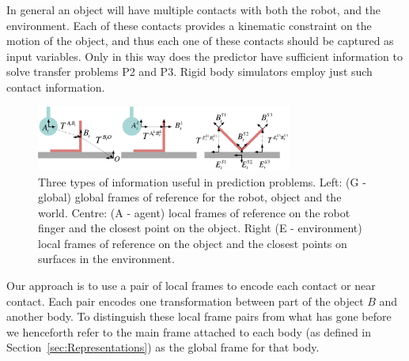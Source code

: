 In general an object will have multiple contacts with both the robot, and the environment. Each of these contacts provides a kinematic constraint on the motion of the object, and thus each one of these contacts should be captured as input variables. Only in this way does the predictor have sufficient information to solve transfer problems P2 and P3. Rigid body simulators employ just such contact information. 


\begin{figure}[t]
\centerline{\includegraphics[width=0.75\textwidth]{information}}
\caption{Three types of information useful in prediction problems. Left: (G - global) global frames of reference for the robot, object and the world. Centre: (A - agent) local frames of reference on the robot finger and the closest point on the object. Right (E - environment) local frames of reference on the object and the closest points on surfaces in the environment.}
\label{fig:Learning.setup2}
\end{figure}

Our approach is to use a pair of local frames to encode each contact or near contact. Each pair encodes one transformation between part of the object $B$ and another body.  To distinguish these local frame pairs from what has gone before we henceforth refer to the main frame attached to each body (as defined in Section~\ref{sec:Representations}) as the global frame for that body. 

